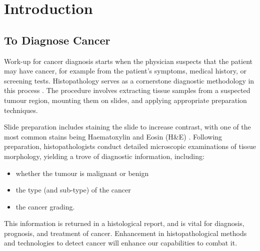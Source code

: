 \documentclass{l4proj}
\begin{document}
%
%
%
%
\chapter{Introduction}


\section{To Diagnose Cancer}

Work-up for cancer diagnosis starts when the physician suspects that the patient may have cancer, for example from the patient's symptoms, medical history, or screening tests. Histopathology serves as a cornerstone diagnostic methodology in this process \citep{cancerNIH}. The procedure involves extracting tissue samples from a suspected tumour region, mounting them on slides, and applying appropriate preparation techniques. 

Slide preparation includes staining the slide to increase contrast, with one of the most common stains being Haematoxylin and Eosin (H\&E) \citep{Morrison2022}. Following preparation, histopathologists conduct detailed microscopic examinations of tissue morphology, yielding a trove of diagnostic information, including:
\begin{itemize}
    \item whether the tumour is malignant or benign
    \item the type (and sub-type) of the cancer
    \item the cancer grading.
\end{itemize}
This information is returned in a histological report, and is vital for diagnosis, prognosis, and treatment of cancer. Enhancement in histopathological methods and technologies to detect cancer will enhance our capabilities to combat it.
\end{document}
